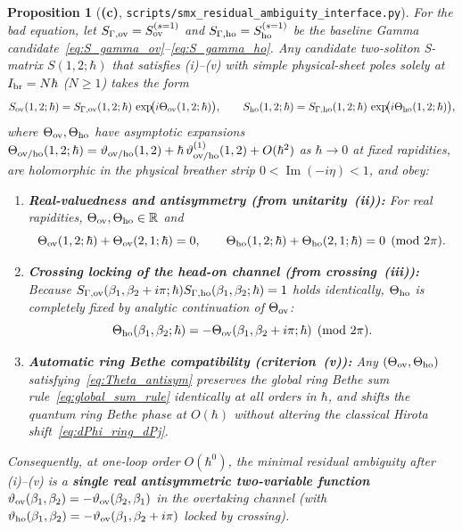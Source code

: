 \documentclass[11pt,a4paper]{article}
\newcommand{\Lc}{\textsf{\textbf{(c)}}}
\newcommand{\smxamb}{\texttt{scripts/\allowbreak smx\_\allowbreak residual\_\allowbreak ambiguity\_\allowbreak interface.py}}
\newtheorem{proposition}{Proposition}[section]
\theoremstyle{remark}
\begin{document}
\begin{proposition}[\Lc, \smxamb]\label{prop:min_amb}
For the bad equation, let $S_{\Gamma,\rm ov}=S_{\rm ov}^{(s=1)}$ and $S_{\Gamma,\rm ho}=S_{\rm ho}^{(s=1)}$ be the baseline Gamma candidate~\eqref{eq:S_gamma_ov}--\eqref{eq:S_gamma_ho}. Any candidate two-soliton S-matrix $S(1,2;\hbar)$ that satisfies (i)--(v) with simple physical-sheet poles solely at $I_{\rm br}=N\hbar$ ($N\ge 1$) takes the form
\begin{equation}\label{eq:S_residual_form}
S_{\rm ov}(1,2;\hbar)=S_{\Gamma,\rm ov}(1,2;\hbar)\,\exp\!\bigl(i\Theta_{\rm ov}(1,2;\hbar)\bigr),\qquad
S_{\rm ho}(1,2;\hbar)=S_{\Gamma,\rm ho}(1,2;\hbar)\,\exp\!\bigl(i\Theta_{\rm ho}(1,2;\hbar)\bigr),
\end{equation}
where $\Theta_{\rm ov},\Theta_{\rm ho}$ have asymptotic expansions $\Theta_{\rm ov/ho}(1,2;\hbar)=\vartheta_{\rm ov/ho}(1,2)+\hbar\,\vartheta_{\rm ov/ho}^{(1)}(1,2)+O(\hbar^2)$ as $\hbar\to 0$ at fixed rapidities, are holomorphic in the physical breather strip $0<\operatorname{Im}(-i\eta)<1$, and obey:
\begin{enumerate}
\item \textbf{Real-valuedness and antisymmetry (from unitarity~(ii)):}
For real rapidities, $\Theta_{\rm ov},\Theta_{\rm ho}\in\mathbb R$ and
\begin{equation}\label{eq:Theta_antisym}
\Theta_{\rm ov}(1,2;\hbar)+\Theta_{\rm ov}(2,1;\hbar)=0,\qquad
\Theta_{\rm ho}(1,2;\hbar)+\Theta_{\rm ho}(2,1;\hbar)=0\pmod{2\pi}.
\end{equation}
\item \textbf{Crossing locking of the head-on channel (from crossing~(iii)):}
Because $S_{\Gamma,\rm ov}(\beta_1,\beta_2+i\pi;\hbar)S_{\Gamma,\rm ho}(\beta_1,\beta_2;\hbar)=1$ holds identically, $\Theta_{\rm ho}$ is completely fixed by analytic continuation of $\Theta_{\rm ov}$:
\begin{equation}\label{eq:Theta_crossing}
\Theta_{\rm ho}(\beta_1,\beta_2;\hbar)=-\Theta_{\rm ov}(\beta_1,\beta_2+i\pi;\hbar)\pmod{2\pi}.
\end{equation}
\item \textbf{Automatic ring Bethe compatibility (criterion~(v)):}
Any $(\Theta_{\rm ov},\Theta_{\rm ho})$ satisfying~\eqref{eq:Theta_antisym} preserves the global ring Bethe sum rule~\eqref{eq:global_sum_rule} identically at all orders in $\hbar$, and shifts the quantum ring Bethe phase at $O(\hbar)$ without altering the classical Hirota shift~\eqref{eq:dPhi_ring_dPj}.
\end{enumerate}
Consequently, at one-loop order $O(\hbar^0)$, the \emph{minimal residual ambiguity} after (i)--(v) is a \textbf{single real antisymmetric two-variable function} $\vartheta_{\rm ov}(\beta_1,\beta_2)=-\vartheta_{\rm ov}(\beta_2,\beta_1)$ in the overtaking channel (with $\vartheta_{\rm ho}(\beta_1,\beta_2)=-\vartheta_{\rm ov}(\beta_1,\beta_2+i\pi)$ locked by crossing).
\end{proposition}
\end{document}
